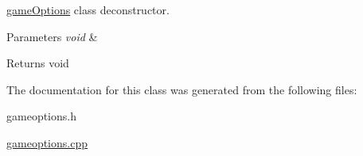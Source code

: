 \mbox{\hyperlink{classgame_options}{game\+Options}} class deconstructor. 


\begin{DoxyParams}{Parameters}
{\em void} & \\
\hline
\end{DoxyParams}
\begin{DoxyReturn}{Returns}
void 
\end{DoxyReturn}


The documentation for this class was generated from the following files\+:\begin{DoxyCompactItemize}
\item 
gameoptions.\+h\item 
\mbox{\hyperlink{gameoptions_8cpp}{gameoptions.\+cpp}}\end{DoxyCompactItemize}
